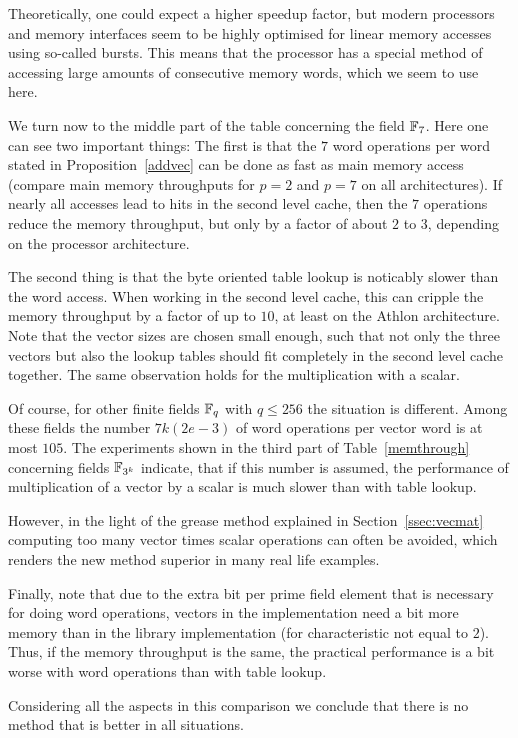 Theoretically, one could expect a higher speedup factor, but modern
processors and memory interfaces seem to be highly optimised for 
linear memory accesses using so-called bursts. This means that the
processor has a special method of accessing large amounts of consecutive
memory words, which we seem to use here.

We turn now to the middle part of the table concerning the field $\mathbb{F}_7$.
Here one can see two important things: The first is that the $7$ word
operations per word stated in Proposition~\ref{addvec} can be done as
fast as main memory access (compare main memory throughputs for $p=2$ and
$p=7$ on all architectures). If nearly all accesses lead to hits in 
the second level cache, then the $7$ operations reduce the memory
throughput, but only by a factor of about $2$ to $3$, depending on
the processor architecture.

The second thing is that the byte oriented table lookup is noticably
slower than the word access. When working in the second level cache,
this can cripple the memory throughput by a factor of up to $10$, at least on
the Athlon architecture. Note that the vector sizes are chosen small
enough, such that not only the three vectors but also the lookup tables
should fit completely in the second level cache together.
The same observation holds for the multiplication with a scalar. 

Of course, for other finite fields $\mathbb{F}_q$ with $q \le 256$ the situation
is different. Among these fields the number $7k(2e-3)$ of word
operations per vector word is at most $105$. The experiments shown in
the third part of Table~\ref{memthrough} concerning fields $\mathbb{F}_{3^k}$ 
indicate, that
if this number is assumed, the performance of multiplication of a vector
by a scalar is much slower than with table lookup. 

However, in the light of the grease method explained in
Section~\ref{ssec:vecmat} computing too many vector times scalar 
operations can often be avoided, which renders the new method
superior in many real life examples.

Finally, note that due to the extra bit per prime field element that
is necessary for doing word operations, vectors in the {\cvec}
implementation need a bit more memory than in the {\GAP} library
implementation (for characteristic not equal to $2$).
Thus, if the memory throughput is the same, the practical performance is 
a bit worse with word operations than with table lookup.

Considering all the aspects in this comparison we conclude that there 
is no method that is better in all situations.

